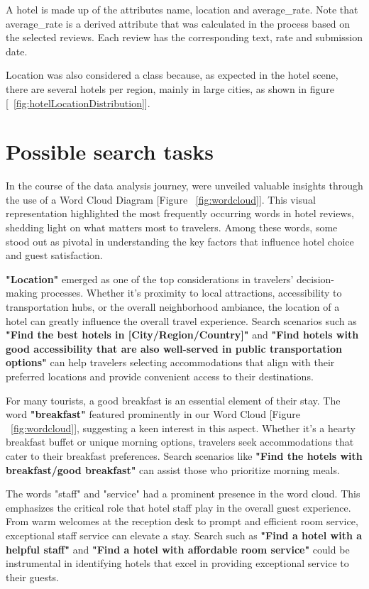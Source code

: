\documentclass[sigconf]{acmart}
\begin{document}
A hotel is made up of the attributes name, location and average\_rate. Note that average\_rate is a derived attribute that was calculated in the process based on the selected reviews. Each review has the corresponding text, rate and submission date.

Location was also considered a class because, as expected in the hotel scene, there are several hotels per region, mainly in large cities, as shown in figure [~\ref{fig:hotelLocationDistribution}].

\section{Possible search tasks}

In the course of the data analysis journey, were unveiled valuable insights through the use of a Word Cloud Diagram [Figure ~\ref{fig:wordcloud}]. This visual representation highlighted the most frequently occurring words in hotel reviews, shedding light on what matters most to travelers. Among these words, some stood out as pivotal in understanding the key factors that influence hotel choice and guest satisfaction.

\textbf{"Location"} emerged as one of the top considerations in travelers' decision-making processes. Whether it's proximity to local attractions, accessibility to transportation hubs, or the overall neighborhood ambiance, the location of a hotel can greatly influence the overall travel experience. Search scenarios such as \textbf{"Find the best hotels in [City/Region/Country]"} and \textbf{"Find hotels with good accessibility that are also well-served in public transportation options"} can help travelers selecting accommodations that align with their preferred locations and provide convenient access to their destinations.

For many tourists, a good breakfast is an essential element of their stay. The word \textbf{"breakfast"} featured prominently in our Word Cloud [Figure ~\ref{fig:wordcloud}], suggesting a keen interest in this aspect. Whether it's a hearty breakfast buffet or unique morning options, travelers seek accommodations that cater to their breakfast preferences. Search scenarios like \textbf{"Find the hotels with breakfast/good breakfast"} can assist those who prioritize morning meals.

The words "staff" and "service" had a prominent presence in the word cloud. This emphasizes the critical role that hotel staff play in the overall guest experience. From warm welcomes at the reception desk to prompt and efficient room service, exceptional staff service can elevate a stay. Search  such as \textbf{"Find a hotel with a helpful staff"} and \textbf{"Find a hotel with affordable room service"} could be instrumental in identifying hotels that excel in providing exceptional service to their guests.
\end{document}
